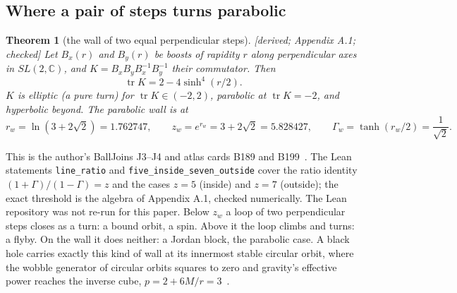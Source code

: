 \documentclass[11pt]{article}
\newtheorem{theorem}{Theorem}\newtheorem{proposition}[theorem]{Proposition}\newtheorem{lemma}[theorem]{Lemma}
\theoremstyle{definition}\newtheorem{hypothesis}{Hypothesis}\newtheorem{prediction}{Prediction}
\theoremstyle{remark}\newtheorem{remark}[theorem]{Remark}
\newcommand{\grade}[1]{\textsf{\small[#1]}}
\begin{document}
\subsection{Where a pair of steps turns parabolic}
\begin{theorem}[the wall of two equal perpendicular steps]\label{thm:wall}\grade{derived; Appendix A.1; checked}
Let $B_x(r)$ and $B_y(r)$ be boosts of rapidity $r$ along perpendicular axes in $SL(2,\mathbb C)$, and $K=B_xB_yB_x^{-1}B_y^{-1}$ their commutator. Then
\begin{equation}
\operatorname{tr}K=2-4\sinh^4(r/2).
\end{equation}
$K$ is elliptic (a pure turn) for $\operatorname{tr}K\in(-2,2)$, parabolic at $\operatorname{tr}K=-2$, and hyperbolic beyond. The parabolic wall is at
\begin{equation}
r_w=\ln(3+2\sqrt2)=1.762747,\qquad z_w=e^{r_w}=3+2\sqrt2=5.828427,\qquad \Gamma_w=\tanh(r_w/2)=\frac1{\sqrt2}.
\end{equation}
\end{theorem}
This is the author's BallJoins J3--J4 and atlas cards B189 and B199~\cite{TwoTrees,Atlas,SMball}. The Lean statements \texttt{line\_ratio} and \texttt{five\_inside\_seven\_outside} cover the ratio identity $(1+\Gamma)/(1-\Gamma)=z$ and the cases $z=5$ (inside) and $z=7$ (outside); the exact threshold is the algebra of Appendix A.1, checked numerically. The Lean repository was not re-run for this paper. Below $z_w$ a loop of two perpendicular steps closes as a turn: a bound orbit, a spin. Above it the loop climbs and turns: a flyby. On the wall it does neither: a Jordan block, the parabolic case. A black hole carries exactly this kind of wall at its innermost stable circular orbit, where the wobble generator of circular orbits squares to zero and gravity's effective power reaches the inverse cube, $p=2+6M/r=3$~\cite{BH}.
\end{document}
